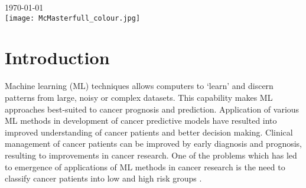 \begin{titlepage}


{\large \today}\\[2cm] %


\texttt{[image: McMasterfull\_colour.jpg]}\\[1cm] %


\vfill %

\end{titlepage}

\linespread{1.25}




\section{Introduction}

\noindent
Machine learning (ML) techniques allows computers to `learn' and discern patterns from large, noisy or complex datasets. This capability makes ML approaches best-suited to cancer prognosis and prediction. Application of various ML methods in development of cancer predictive models have resulted into improved understanding of cancer patients and better decision making. Clinical management of cancer patients can be improved by early diagnosis and prognosis, resulting to improvements in cancer research. One of the problems which has led to emergence of applications of ML methods in cancer research is the need to classify cancer patients into low and high risk groups \citep{kourou2015machine}.\\

